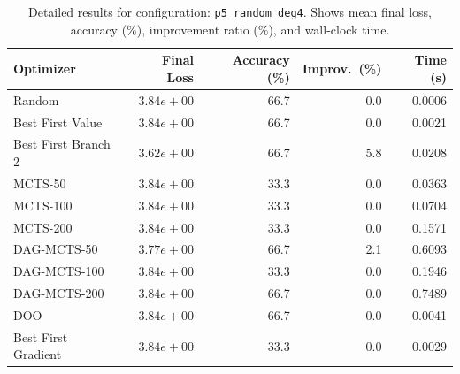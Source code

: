 \begin{table}[H]
\centering
\caption{Detailed results for configuration: \texttt{p5\_random\_deg4}. Shows mean final loss, accuracy (\%), improvement ratio (\%), and wall-clock time.}
\label{tab:funclearn-detail-27}
\begin{tabular}{lrrrr}
\toprule
Optimizer & Final Loss & Accuracy (\%) & Improv.~(\%) & Time (s) \\
\midrule
Random & $3.84e+00$ & 66.7 & 0.0 & 0.0006 \\
\hline
Best First Value & $3.84e+00$ & 66.7 & 0.0 & 0.0021 \\
\hline
Best First Branch 2 & \textbf{$3.62e+00$} & 66.7 & 5.8 & 0.0208 \\
\hline
MCTS-50 & $3.84e+00$ & 33.3 & 0.0 & 0.0363 \\
\hline
MCTS-100 & $3.84e+00$ & 33.3 & 0.0 & 0.0704 \\
\hline
MCTS-200 & $3.84e+00$ & 33.3 & 0.0 & 0.1571 \\
\hline
DAG-MCTS-50 & $3.77e+00$ & 66.7 & 2.1 & 0.6093 \\
\hline
DAG-MCTS-100 & $3.84e+00$ & 33.3 & 0.0 & 0.1946 \\
\hline
DAG-MCTS-200 & $3.84e+00$ & 66.7 & 0.0 & 0.7489 \\
\hline
DOO & $3.84e+00$ & 66.7 & 0.0 & 0.0041 \\
\hline
Best First Gradient & $3.84e+00$ & 33.3 & 0.0 & 0.0029 \\
\bottomrule
\end{tabular}
\end{table}

